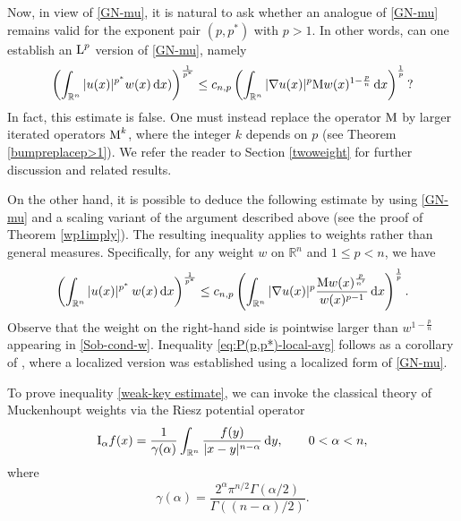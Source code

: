 \documentclass[11pt, a4paper, reqno]{amsart}
\newcommand{\R}{\mathbb R}
\newcommand{\al}{\alpha}
\newcommand{\dx}{\,{\mathrm dx}}
\newcommand{\dy}{\,{\mathrm dy}}
\newcommand{\Lup}{\textup{L}}
\theoremstyle{definition}
\theoremstyle{remark}
\begin{document}
Now, in view of \eqref{GN-mu}, it is natural to ask whether an analogue of \eqref{GN-mu} remains valid for the exponent pair $(p,p^*)$ with $p>1$. In other words, can one establish an $\Lup^p$ version of \eqref{GN-mu}, namely
\begin{equation}\label{Sob-mu}
\left(\int_{\mathbb{R}^n} |u(x)|^{p^*}w(x)\dx) \right)^{\frac1{p^*}}
\leq c_{n,p} \left(\int_{\mathbb{R}^n} |\nabla u(x)|^p \textup{M}w(x)^{1-\frac{p}{n}}\dx\right)^{\frac1{p}}\text{?}
\end{equation}
In fact, this estimate is false. One must instead replace the operator $\textup{M}$ by larger iterated operators $\textup{M}^k$, where the integer $k$ depends on $p$ (see Theorem \ref{bumpreplacep>1}). We refer the reader to Section \ref{twoweight} for further discussion and related results.

On the other hand, it is possible to deduce the following estimate by using \eqref{GN-mu} and a scaling variant of the argument described above (see the proof of Theorem \ref{wp1imply}). The resulting inequality applies to weights rather than general measures. Specifically, for any weight $w$ on $\mathbb{R}^n$ and $1 \le p < n$, we have
\begin{equation}\label{eq:P(p,p*)-local-avg}
\left(\int_{\R^n} |u(x)|^{p^*}\,w(x)\dx \right)^{\frac1{p^*}}
\le c_{n,p} \left( \int_{\R^n} |\nabla u(x)|^p 
\frac{\textup{M}w(x)^{\frac{p}{n'}}}{w(x)^{p-1}} \dx \right)^{\frac{1}{p}}.
\end{equation}
Observe that the weight on the right-hand side is pointwise larger than $w^{1-\frac{p}{n}}$ appearing in \eqref{Sob-cond-w}. Inequality \eqref{eq:P(p,p*)-local-avg} follows as a corollary of \cite[Theorem 1.21]{PR1}, where a localized version was established using a localized form of \eqref{GN-mu}.




To prove inequality \eqref{weak-key estimate}, we can invoke the classical theory of Muckenhoupt weights via the Riesz potential operator
\[
\textup{I}_\al f(x)
= \frac{1}{\gamma(\al)} \int_{\R^n} \frac{f(y)}{|x-y|^{n-\al}}\dy,
\qquad 0 < \al < n,
\]
where
\begin{equation*}\label{fracconst}
\gamma(\al)
= \frac{2^\al \pi^{n/2} \Gamma(\al/2)}{\Gamma((n-\al)/2)}.
\end{equation*}
\end{document}
